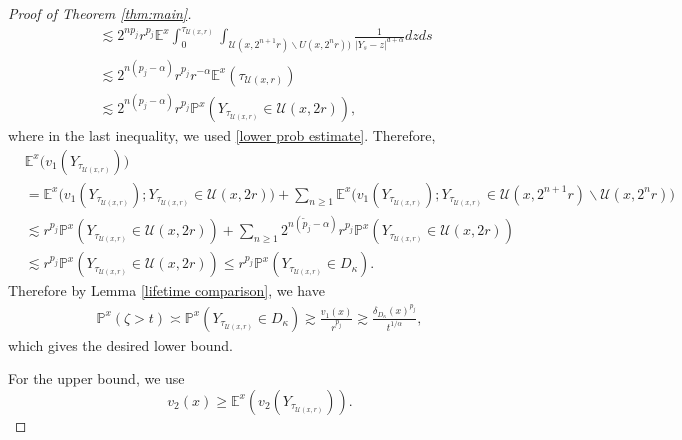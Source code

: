 \documentclass[12pt,a4paper]{amsart}
\numberwithin{equation}{section}
\theoremstyle{plain}
\newcommand{\mc}{\mathcal}
\newcommand{\mb}{\mathbb}
\newcommand{\wt}{\widetilde}
\newcommand{\1}{\mathbbm{1}}
\begin{document}
\begin{proof}[Proof of Theorem \ref{thm:main}]
\begin{align*}
& \lesssim 2^{n p_j}r^{p_j} \mb E^x \int_0^{\tau_{\mc U(x,r)}} \int_{\mc U(x,2^{n+1}r)\backslash U(x,2^{n}r))}\frac{1}{|Y_s - z|^{d+\alpha}}dzds \\
& \lesssim 2^{n( p_j - \alpha)}r^{p_j} r^{-\alpha} \mb E^x(\tau_{\mc U(x,r)}) \\
& \lesssim 2^{n( p_j - \alpha)}r^{p_j} \mb P^x(Y_{\tau_{\mc U(x,r)}} \in \mc U(x,2r)),
\end{align*}
where in the last inequality, we used \eqref{lower prob estimate}. Therefore,
\begin{align*}
& \mb E^x\big(v_1(Y_{\tau_{\mc U(x,r)}})\big) \\
& = \mb E^x\big(v_1(Y_{\tau_{\mc U(x,r)}}); Y_{\tau_{\mc U(x,r)}} \in \mc U(x,2r)\big) + \sum_{n\ge 1} \mb E^x\big(v_1(Y_{\tau_{\mc U(x,r)}}); Y_{\tau_{\mc U(x,r)}} \in \mc U(x,2^{n+1}r)\backslash \mc U(x,2^{n}r)\big) \\
& \lesssim r^{p_j} \mb P^x(Y_{\tau_{\mc U(x,r)}} \in \mc U(x,2r)) + \sum_{n \ge 1} 2^{n(\wt p_j - \alpha)}r^{p_j} \mb P^x(Y_{\tau_{\mc U(x,r)}} \in \mc U(x,2r)) \\
& \lesssim r^{p_j} \mb P^x(Y_{\tau_{\mc U(x,r)}} \in \mc U(x,2r)) \le r^{p_j} 
\mb P^x(Y_{\tau_{\mc U(x,r)}} \in D_\kappa).
\end{align*}
Therefore by Lemma \ref{lifetime comparison}, we have 
\begin{align*}
\mb P^x(\zeta > t) 
\asymp \mb P^x(Y_{\tau_{\mc U(x,r)}} \in D_\kappa)
\gtrsim \frac{v_1(x)}{r^{p_j}} \gtrsim \frac{\delta_{D_{\kappa}}(x)^{p_j}}{t^{1/\alpha}},
\end{align*}
which gives the desired lower bound.

For the upper bound, we use
\begin{equation}
v_2(x) \ge \mb E^x(v_2(Y_{\tau_{\mc U(x,r)}})).
\end{equation}


\end{proof}
\end{document}
